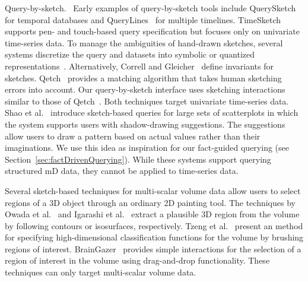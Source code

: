 \textsf{Query-by-sketch.\ } 
Early examples of query-by-sketch tools include QuerySketch~\cite{Wattenberg2001} for temporal databases and QueryLines~\cite{Ryall2005} for multiple timelines. 
TimeSketch~\cite{Eichmann2015} supports pen- and touch-based query specification but focuses only on univariate time-series data.
To manage the ambiguities of hand-drawn sketches, several systems discretize the query and datasets into symbolic or quantized representations~\cite{Muthumanickam2016,ruta2019sax}.
%
Alternatively, Correll and Gleicher~\cite{Correll2016} define invariants for sketches. %
Qetch~\cite{Mannino2018} provides a matching algorithm that takes human sketching errors into account.
Our query-by-sketch interface uses sketching interactions similar to those of Qetch~\cite{Mannino2018}.
Both techniques target univariate time-series data.
%
Shao et al.~\cite{Shao2014} introduce sketch-based queries for large sets of scatterplots
in which the system supports users with shadow-drawing suggestions. %
The suggestions allow users to draw a pattern based on actual values rather than their imaginations.
We use this idea as inspiration for our fact-guided querying (see Section~\ref{sec:factDrivenQuerying}).
While these systems support querying structured mD data, they cannot be applied to time-series data.

Several sketch-based techniques for multi-scalar volume data allow users to select regions of a 3D object through an ordinary 2D painting tool.
The techniques by Owada et al.~\cite{Owada2005} and Igarashi et al.~\cite{Igarashi2016} extract a plausible 3D region from the volume
by following contours or isosurfaces, respectively.
Tzeng et al.~\cite{Tzeng2003} present an method for specifying high-dimensional classification functions for the volume
by brushing regions of interest. %
BrainGazer~\cite{Bruckner2009} provides simple interactions for the selection of a region of interest in the volume
using drag-and-drop functionality.
These techniques can only target multi-scalar volume data. 

